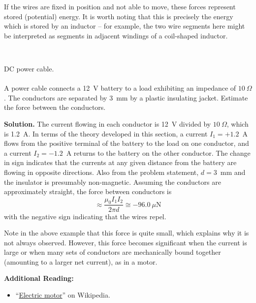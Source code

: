 If the wires are fixed in position and not able to move, these forces represent stored (potential) energy.  
It is worth noting that this is precisely the energy which is stored by an inductor -- for example, the two wire segments here might be interpreted as segments in adjacent windings of a coil-shaped inductor.

~\\ \begin{example} 
\begin{mdframed}[backgroundcolor=brown!20,linecolor=brown!20]\raggedright
DC power cable. 
\\~\\
A power cable connects a 12~V battery to a load exhibiting an impedance of $10~\Omega$.
The conductors are separated by 3~mm by a plastic insulating jacket.
Estimate the force between the conductors.

{\bf Solution.}
The current flowing in each conductor is 12~V divided by $10~\Omega$, which is 1.2~A.  
In terms of the theory developed in this section, a current $I_1=+1.2$~A flows from the positive terminal of the battery to the load on one conductor, and a current $I_2=-1.2$~A returns to the battery on the other conductor. 
The change in sign indicates that the currents at any given distance from the battery are flowing in opposite directions.
Also from the problem statement, $d=3$~mm and the insulator is presumably non-magnetic.
Assuming the conductors are approximately straight, the force between conductors is
$$ \approx \frac{\mu_0 I_1 I_2}{2\pi d} \cong -96.0~\mu\mbox{N} $$
with the negative sign indicating that the wires repel.
\end{mdframed}
\end{example}

Note in the above example that this force is quite small, which explains why it is not always observed.
However, this force becomes significant when the current is large or when many sets of conductors are mechanically bound together (amounting to a larger net current), as in a motor.


{\bf Additional Reading:}
\begin{itemize}
\item ``\href{https://wikipedia.org/wiki/Electric_motor}{Electric motor}'' on Wikipedia.
\end{itemize}

